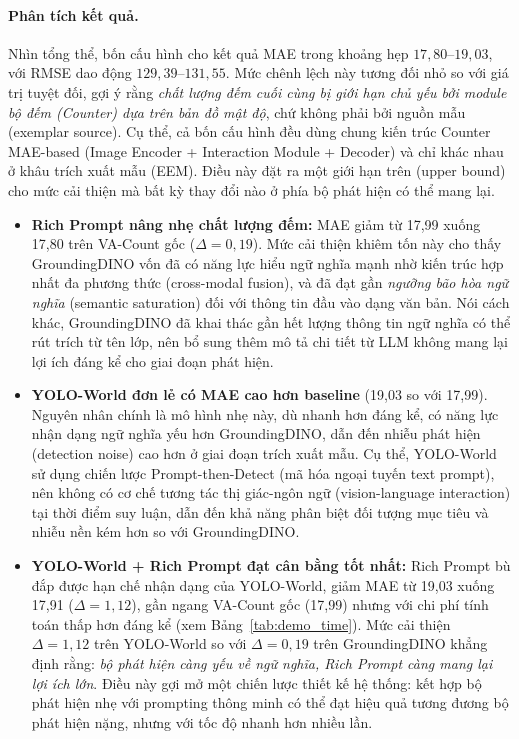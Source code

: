 \documentclass[a4paper,12pt]{report}
\numberwithin{figure}{chapter}
\numberwithin{table}{chapter}
\begin{document}
\paragraph{Phân tích kết quả.}

Nhìn tổng thể, bốn cấu hình cho kết quả MAE trong khoảng hẹp $17{,}80$--$19{,}03$, với RMSE dao động $129{,}39$--$131{,}55$. Mức chênh lệch này tương đối nhỏ so với giá trị tuyệt đối, gợi ý rằng \emph{chất lượng đếm cuối cùng bị giới hạn chủ yếu bởi module bộ đếm (Counter) dựa trên bản đồ mật độ}, chứ không phải bởi nguồn mẫu (exemplar source). Cụ thể, cả bốn cấu hình đều dùng chung kiến trúc Counter MAE-based (Image Encoder + Interaction Module + Decoder) và chỉ khác nhau ở khâu trích xuất mẫu (EEM). Điều này đặt ra một giới hạn trên (upper bound) cho mức cải thiện mà bất kỳ thay đổi nào ở phía bộ phát hiện có thể mang lại.

\begin{itemize}
    \item \textbf{Rich Prompt nâng nhẹ chất lượng đếm:} MAE giảm từ 17,99 xuống 17,80 trên VA-Count gốc ($\Delta = 0{,}19$). Mức cải thiện khiêm tốn này cho thấy GroundingDINO vốn đã có năng lực hiểu ngữ nghĩa mạnh nhờ kiến trúc hợp nhất đa phương thức (cross-modal fusion), và đã đạt gần \emph{ngưỡng bão hòa ngữ nghĩa} (semantic saturation) đối với thông tin đầu vào dạng văn bản. Nói cách khác, GroundingDINO đã khai thác gần hết lượng thông tin ngữ nghĩa có thể rút trích từ tên lớp, nên bổ sung thêm mô tả chi tiết từ LLM không mang lại lợi ích đáng kể cho giai đoạn phát hiện.

    \item \textbf{YOLO-World đơn lẻ có MAE cao hơn baseline} (19,03 so với 17,99). Nguyên nhân chính là mô hình nhẹ này, dù nhanh hơn đáng kể, có năng lực nhận dạng ngữ nghĩa yếu hơn GroundingDINO, dẫn đến nhiễu phát hiện (detection noise) cao hơn ở giai đoạn trích xuất mẫu. Cụ thể, YOLO-World sử dụng chiến lược Prompt-then-Detect (mã hóa ngoại tuyến text prompt), nên không có cơ chế tương tác thị giác-ngôn ngữ (vision-language interaction) tại thời điểm suy luận, dẫn đến khả năng phân biệt đối tượng mục tiêu và nhiễu nền kém hơn so với GroundingDINO.

    \item \textbf{YOLO-World + Rich Prompt đạt cân bằng tốt nhất:} Rich Prompt bù đắp được hạn chế nhận dạng của YOLO-World, giảm MAE từ 19,03 xuống 17,91 ($\Delta = 1{,}12$), gần ngang VA-Count gốc (17,99) nhưng với chi phí tính toán thấp hơn đáng kể (xem Bảng~\ref{tab:demo_time}). Mức cải thiện $\Delta = 1{,}12$ trên YOLO-World so với $\Delta = 0{,}19$ trên GroundingDINO khẳng định rằng: \emph{bộ phát hiện càng yếu về ngữ nghĩa, Rich Prompt càng mang lại lợi ích lớn}. Điều này gợi mở một chiến lược thiết kế hệ thống: kết hợp bộ phát hiện nhẹ với prompting thông minh có thể đạt hiệu quả tương đương bộ phát hiện nặng, nhưng với tốc độ nhanh hơn nhiều lần.
\end{itemize}
\end{document}

